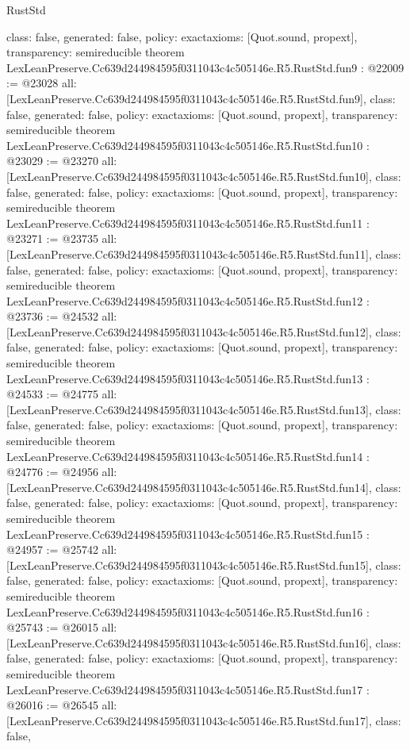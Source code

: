 \begin{lexlean}{RustStd}
\begin{coremodule}
{  class: false,
  generated: false,
  policy: exact{axioms: [Quot.sound, propext]},
  transparency: semireducible
}
theorem LexLeanPreserve.Cc639d244984595f0311043c4c505146e.R5.RustStd.fun9 : @22009 := @23028 {
  all: [LexLeanPreserve.Cc639d244984595f0311043c4c505146e.R5.RustStd.fun9],
  class: false,
  generated: false,
  policy: exact{axioms: [Quot.sound, propext]},
  transparency: semireducible
}
theorem LexLeanPreserve.Cc639d244984595f0311043c4c505146e.R5.RustStd.fun10 : @23029 := @23270 {
  all: [LexLeanPreserve.Cc639d244984595f0311043c4c505146e.R5.RustStd.fun10],
  class: false,
  generated: false,
  policy: exact{axioms: [Quot.sound, propext]},
  transparency: semireducible
}
theorem LexLeanPreserve.Cc639d244984595f0311043c4c505146e.R5.RustStd.fun11 : @23271 := @23735 {
  all: [LexLeanPreserve.Cc639d244984595f0311043c4c505146e.R5.RustStd.fun11],
  class: false,
  generated: false,
  policy: exact{axioms: [Quot.sound, propext]},
  transparency: semireducible
}
theorem LexLeanPreserve.Cc639d244984595f0311043c4c505146e.R5.RustStd.fun12 : @23736 := @24532 {
  all: [LexLeanPreserve.Cc639d244984595f0311043c4c505146e.R5.RustStd.fun12],
  class: false,
  generated: false,
  policy: exact{axioms: [Quot.sound, propext]},
  transparency: semireducible
}
theorem LexLeanPreserve.Cc639d244984595f0311043c4c505146e.R5.RustStd.fun13 : @24533 := @24775 {
  all: [LexLeanPreserve.Cc639d244984595f0311043c4c505146e.R5.RustStd.fun13],
  class: false,
  generated: false,
  policy: exact{axioms: [Quot.sound, propext]},
  transparency: semireducible
}
theorem LexLeanPreserve.Cc639d244984595f0311043c4c505146e.R5.RustStd.fun14 : @24776 := @24956 {
  all: [LexLeanPreserve.Cc639d244984595f0311043c4c505146e.R5.RustStd.fun14],
  class: false,
  generated: false,
  policy: exact{axioms: [Quot.sound, propext]},
  transparency: semireducible
}
theorem LexLeanPreserve.Cc639d244984595f0311043c4c505146e.R5.RustStd.fun15 : @24957 := @25742 {
  all: [LexLeanPreserve.Cc639d244984595f0311043c4c505146e.R5.RustStd.fun15],
  class: false,
  generated: false,
  policy: exact{axioms: [Quot.sound, propext]},
  transparency: semireducible
}
theorem LexLeanPreserve.Cc639d244984595f0311043c4c505146e.R5.RustStd.fun16 : @25743 := @26015 {
  all: [LexLeanPreserve.Cc639d244984595f0311043c4c505146e.R5.RustStd.fun16],
  class: false,
  generated: false,
  policy: exact{axioms: [Quot.sound, propext]},
  transparency: semireducible
}
theorem LexLeanPreserve.Cc639d244984595f0311043c4c505146e.R5.RustStd.fun17 : @26016 := @26545 {
  all: [LexLeanPreserve.Cc639d244984595f0311043c4c505146e.R5.RustStd.fun17],
  class: false,
}
\end{coremodule}
\end{lexlean}
